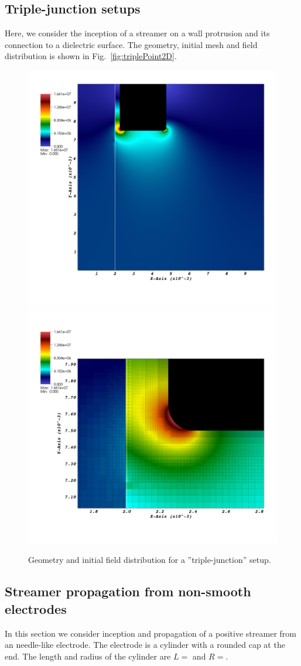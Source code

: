 \documentclass[3p]{elsarticle}
\begin{document}
\subsection{Triple-junction setups}
\label{sec:triple2d}
Here, we consider the inception of a streamer on a wall protrusion and its connection to a dielectric surface. The geometry, initial mesh and field distribution is shown in Fig.~\ref{fig:triplePoint2D}.
\begin{figure}[ht]
  \includegraphics[width=.45\textwidth]{./figures/triplePoint2d/t0_big}
  \hfill
  \includegraphics[width=.45\textwidth]{./figures/triplePoint2d/t0_small}
  \caption{Geometry and initial field distribution for a ''triple-junction'' setup.}
  \label{fig:triplePoint2d}
\end{figure}

\subsection{Streamer propagation from non-smooth electrodes}
\label{sec:noise2d}
In this section we consider inception and propagation of a positive streamer from an needle-like electrode. The electrode is a cylinder with a rounded cap at the end. The length and radius of the cylinder are $L = $ and $R = $.
\end{document}
